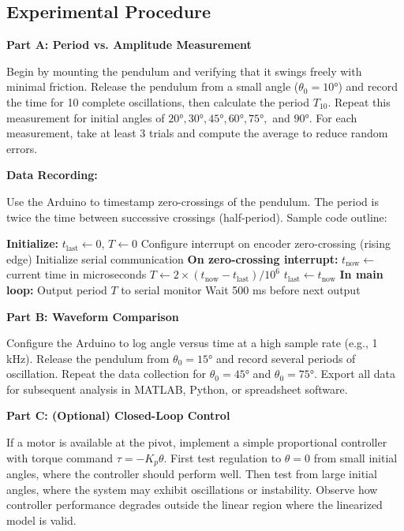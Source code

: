 \subsection{Experimental Procedure}

\textbf{Part A: Period vs. Amplitude Measurement}

Begin by mounting the pendulum and verifying that it swings freely with minimal friction. Release the pendulum from a small angle ($\theta_0 = 10°$) and record the time for 10 complete oscillations, then calculate the period $T_{10}$. Repeat this measurement for initial angles of $20°, 30°, 45°, 60°, 75°,$ and $90°$. For each measurement, take at least 3 trials and compute the average to reduce random errors.

\textbf{Data Recording:}

Use the Arduino to timestamp zero-crossings of the pendulum. The period is twice the time between successive crossings (half-period). Sample code outline:

\begin{algorithm}
\caption{Pendulum Period Measurement}
\begin{algorithmic}[1]
\State \textbf{Initialize:} $t_{\text{last}} \gets 0$, $T \gets 0$
\State Configure interrupt on encoder zero-crossing (rising edge)
\State Initialize serial communication
\State
{}
    \State \textbf{On zero-crossing interrupt:}
    \State \quad $t_{\text{now}} \gets$ current time in microseconds
    \State \quad $T \gets 2 \times (t_{\text{now}} - t_{\text{last}}) / 10^6$ 
    \State \quad $t_{\text{last}} \gets t_{\text{now}}$
    \State
    \State \textbf{In main loop:}
    \State \quad Output period $T$ to serial monitor
    \State \quad Wait 500 ms before next output
\EndWhile
\end{algorithmic}
\end{algorithm}

\textbf{Part B: Waveform Comparison}

Configure the Arduino to log angle versus time at a high sample rate (e.g., 1 kHz). Release the pendulum from $\theta_0 = 15°$ and record several periods of oscillation. Repeat the data collection for $\theta_0 = 45°$ and $\theta_0 = 75°$. Export all data for subsequent analysis in MATLAB, Python, or spreadsheet software.

\textbf{Part C: (Optional) Closed-Loop Control}

If a motor is available at the pivot, implement a simple proportional controller with torque command $\tau = -K_p \theta$. First test regulation to $\theta = 0$ from small initial angles, where the controller should perform well. Then test from large initial angles, where the system may exhibit oscillations or instability. Observe how controller performance degrades outside the linear region where the linearized model is valid.

